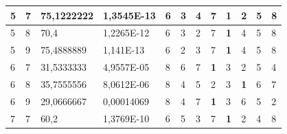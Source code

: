 \documentclass[conference]{IEEEtran}
\begin{document}
\begin{table}[]
\begin{tabular}{|llll|llllllll|}
		\multicolumn{1}{|l|}{5}   & \multicolumn{1}{l|}{7}         & \multicolumn{1}{l|}{75,1222222}    & 1,3545E-13 & \multicolumn{1}{l|}{6}   & \multicolumn{1}{l|}{3}          & \multicolumn{1}{l|}{4}          & \multicolumn{1}{l|}{7}          & \multicolumn{1}{l|}{\textbf{1}} & \multicolumn{1}{l|}{2}          & \multicolumn{1}{l|}{5}   & 8                      \\ \hline
		\multicolumn{1}{|l|}{5}   & \multicolumn{1}{l|}{8}         & \multicolumn{1}{l|}{70,4}          & 1,2265E-12 & \multicolumn{1}{l|}{6}   & \multicolumn{1}{l|}{3}          & \multicolumn{1}{l|}{2}          & \multicolumn{1}{l|}{7}          & \multicolumn{1}{l|}{\textbf{1}} & \multicolumn{1}{l|}{4}          & \multicolumn{1}{l|}{5}   & 8                      \\ \hline
		\multicolumn{1}{|l|}{5}   & \multicolumn{1}{l|}{9}         & \multicolumn{1}{l|}{75,4888889}    & 1,141E-13  & \multicolumn{1}{l|}{6}   & \multicolumn{1}{l|}{2}          & \multicolumn{1}{l|}{3}          & \multicolumn{1}{l|}{7}          & \multicolumn{1}{l|}{\textbf{1}} & \multicolumn{1}{l|}{4}          & \multicolumn{1}{l|}{5}   & 8                      \\ \hline
		\multicolumn{1}{|l|}{6}   & \multicolumn{1}{l|}{7}         & \multicolumn{1}{l|}{31,5333333}    & 4,9557E-05 & \multicolumn{1}{l|}{8}   & \multicolumn{1}{l|}{6}          & \multicolumn{1}{l|}{7}          & \multicolumn{1}{l|}{\textbf{1}} & \multicolumn{1}{l|}{3}          & \multicolumn{1}{l|}{2}          & \multicolumn{1}{l|}{5}   & 4                      \\ \hline
		\multicolumn{1}{|l|}{6}   & \multicolumn{1}{l|}{8}         & \multicolumn{1}{l|}{35,7555556}    & 8,0612E-06 & \multicolumn{1}{l|}{8}   & \multicolumn{1}{l|}{4}          & \multicolumn{1}{l|}{5}          & \multicolumn{1}{l|}{2}          & \multicolumn{1}{l|}{3}          & \multicolumn{1}{l|}{\textbf{1}} & \multicolumn{1}{l|}{6}   & 7                      \\ \hline
		\multicolumn{1}{|l|}{6}   & \multicolumn{1}{l|}{9}         & \multicolumn{1}{l|}{29,0666667}    & 0,00014069 & \multicolumn{1}{l|}{8}   & \multicolumn{1}{l|}{4}          & \multicolumn{1}{l|}{7}          & \multicolumn{1}{l|}{\textbf{1}} & \multicolumn{1}{l|}{3}          & \multicolumn{1}{l|}{6}          & \multicolumn{1}{l|}{5}   & 2                      \\ \hline
		\multicolumn{1}{|l|}{7}   & \multicolumn{1}{l|}{7}         & \multicolumn{1}{l|}{60,2}          & 1,3769E-10 & \multicolumn{1}{l|}{6}   & \multicolumn{1}{l|}{5}          & \multicolumn{1}{l|}{3}          & \multicolumn{1}{l|}{7}          & \multicolumn{1}{l|}{\textbf{1}} & \multicolumn{1}{l|}{2}          & \multicolumn{1}{l|}{4}   & 8                      \\ \hline

\end{tabular}
\end{table}
\end{document}
